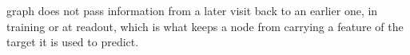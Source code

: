 graph does not pass information from a later visit back to an earlier one, in training or at readout,
which is what keeps a node from carrying a feature of the target it is used to predict.
